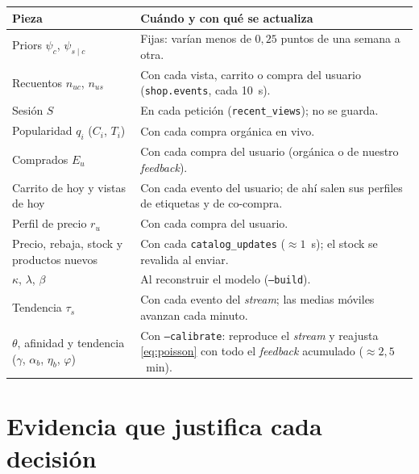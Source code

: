 \documentclass[11pt,a4paper]{article}
\newcommand{\cod}[1]{\texttt{#1}}
\begin{document}
\begin{center}
\begin{tabular}{p{6.2cm}p{8.6cm}}
\toprule
Pieza & Cuándo y con qué se actualiza\\
\midrule
Priors $\psi_c$, $\psi_{s\mid c}$ & Fijas: varían menos de $0{,}25$ puntos de una semana a otra.\\
Recuentos $n_{uc}$, $n_{us}$ & Con cada vista, carrito o compra del usuario (\cod{shop.events}, cada 10~s).\\
Sesión $S$ & En cada petición (\cod{recent\_views}); no se guarda.\\
Popularidad $q_i$ ($C_i$, $T_i$) & Con cada compra orgánica en vivo.\\
Comprados $E_u$ & Con cada compra del usuario (orgánica o de nuestro \emph{feedback}).\\
Carrito de hoy y vistas de hoy & Con cada evento del usuario; de ahí salen sus perfiles de etiquetas y de co-compra.\\
Perfil de precio $r_u$ & Con cada compra del usuario.\\
Precio, rebaja, stock y productos nuevos & Con cada \cod{catalog\_updates} ($\approx 1$~s); el stock se revalida al enviar.\\
$\kappa$, $\lambda$, $\beta$ & Al reconstruir el modelo (\cod{--build}).\\
Tendencia $\tau_s$ & Con cada evento del \emph{stream}; las medias móviles avanzan cada minuto.\\
$\theta$, afinidad y tendencia ($\gamma$, $\alpha_b$, $\eta_b$, $\varphi$) & Con \cod{--calibrate}: reproduce el \emph{stream} y reajusta
\eqref{eq:poisson} con todo el \emph{feedback} acumulado ($\approx 2{,}5$~min).\\
\bottomrule
\end{tabular}
\end{center}

\section{Evidencia que justifica cada decisión}
\end{document}
